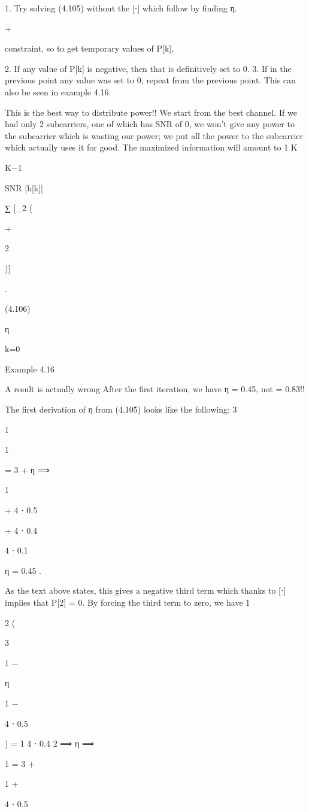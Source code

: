 {{{{{1. Try solving (4.105) without the [⋅]
which follow by finding η.

+

constraint, so to get temporary values of P[k],

2. If any value of P[k] is negative, then that is definitively set to 0.
3. If in the previous point any value was set to 0, repeat from the previous point.
This can also be seen in example 4.16.

This is the best way to distribute power!!
We start from the best channel. If we had only 2 subcarriers, one of which has SNR of 0, we won't give any power to the subcarrier which is wasting our power; we put all the power to the subcarrier which actually uses it for good.
The maximized information will amount to 1 K

K−1

SNR |h[k]|

∑ [\log_2 (

+

2

)]

.

(4.106)

η

k=0

Example 4.16

A result is actually wrong After the first iteration, we have η = 0.45, not = 0.83!!

The first derivation of η from (4.105) looks like the following:
3

1

1

= 3 +
η
⟹

1

+
4 ⋅ 0.5

+
4 ⋅ 0.4

4 ⋅ 0.1

η = 0.45 .

As the text above states, this gives a negative third term which thanks to [⋅]
implies that P[2] = 0. By forcing the third term to zero, we have 1

2
(

3

1
−

η

1
−

4 ⋅ 0.5

) = 1 4 ⋅ 0.4 2
⟹
η
⟹

1
= 3 +

1
+

4 ⋅ 0.5

}}}}}

